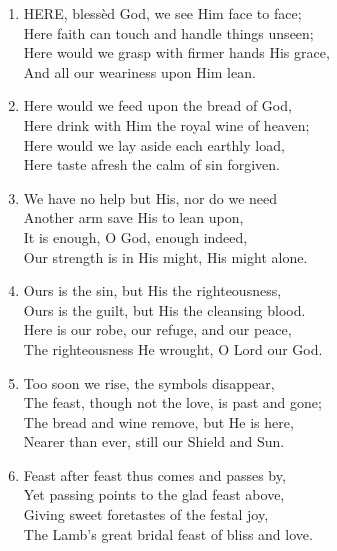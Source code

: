 \documentclass[11pt,a4paper]{article}
\begin{document}
\begin{enumerate}
    \item HERE, bless\`ed God, we see Him face to face; \\
        Here faith can touch and handle things unseen; \\
        Here would we grasp with firmer hands His grace, \\
        And all our weariness upon Him lean.

    \item Here would we feed upon the bread of God, \\
        Here drink with Him the royal wine of heaven; \\
        Here would we lay aside each earthly load, \\
        Here taste afresh the calm of sin forgiven.

    \item We have no help but His, nor do we need \\
        Another arm save His to lean upon, \\
        It is enough, O God, enough indeed, \\
        Our strength is in His might, His might alone.

    \item Ours is the sin, but His the righteousness, \\
        Ours is the guilt, but His the cleansing blood. \\
        Here is our robe, our refuge, and our peace, \\
        The righteousness He wrought, O Lord our God.

    \item Too soon we rise, the symbols disappear, \\
        The feast, though not the love, is past and gone; \\
        The bread and wine remove, but He is here, \\
        Nearer than ever, still our Shield and Sun.

    \item Feast after feast thus comes and passes by, \\
        Yet passing points to the glad feast above, \\
        Giving sweet foretastes of the festal joy, \\
        The Lamb's great bridal feast of bliss and love.

\end{enumerate}
\end{document}
